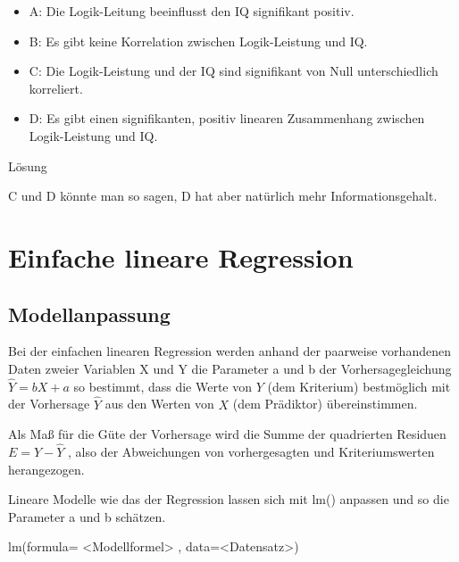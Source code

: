 \documentclass[
]{book}
\newenvironment{Shaded}{\begin{snugshade}}{\end{snugshade}}
\newcommand{\AttributeTok}[1]{\textcolor[rgb]{0.77,0.63,0.00}{#1}}
\newcommand{\FunctionTok}[1]{\textcolor[rgb]{0.00,0.00,0.00}{#1}}
\newcommand{\NormalTok}[1]{#1}
\newcommand{\SpecialCharTok}[1]{\textcolor[rgb]{0.00,0.00,0.00}{#1}}
\providecommand{\tightlist}{%
  \setlength{\itemsep}{0pt}\setlength{\parskip}{0pt}}
\begin{document}
\begin{itemize}
\tightlist
\item
  A: Die Logik-Leitung beeinflusst den IQ signifikant positiv.
\item
  B: Es gibt keine Korrelation zwischen Logik-Leistung und IQ.
\item
  C: Die Logik-Leistung und der IQ sind signifikant von Null unterschiedlich korreliert.
\item
  D: Es gibt einen signifikanten, positiv linearen Zusammenhang zwischen Logik-Leistung und IQ.
\end{itemize}

Lösung

C und D könnte man so sagen, D hat aber natürlich mehr Informationsgehalt.

\hypertarget{einfache-lineare-regression}{%
\section{Einfache lineare Regression}\label{einfache-lineare-regression}}

\hypertarget{modellanpassung}{%
\subsection{Modellanpassung}\label{modellanpassung}}

Bei der einfachen linearen Regression werden anhand der paarweise vorhandenen Daten zweier
Variablen X und Y die Parameter a und b der Vorhersagegleichung \(\hat{Y} = bX + a\) so bestimmt,
dass die Werte von \(Y\) (dem Kriterium) bestmöglich mit der Vorhersage \(\hat{Y}\) aus den Werten
von \(X\) (dem Prädiktor) übereinstimmen.

Als Maß für die Güte der Vorhersage wird die
Summe der quadrierten Residuen \(E = Y - \hat{Y}\) , also der Abweichungen von vorhergesagten und
Kriteriumswerten herangezogen.

Lineare Modelle wie das der Regression lassen sich mit lm() anpassen und so die Parameter a und b schätzen.

\begin{Shaded}
\begin{Highlighting}[]
\FunctionTok{lm}\NormalTok{(}\AttributeTok{formula=} \SpecialCharTok{\textless{}}\NormalTok{Modellformel}\SpecialCharTok{\textgreater{}}\NormalTok{ , }\AttributeTok{data=}\SpecialCharTok{\textless{}}\NormalTok{Datensatz}\SpecialCharTok{\textgreater{}}\NormalTok{)}
\end{Highlighting}
\end{Shaded}
\end{document}
